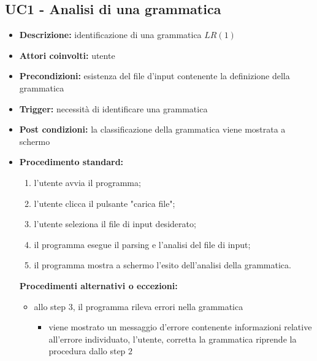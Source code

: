 \documentclass[12pt]{article}
\begin{document}
\subsection{UC1 - Analisi di una grammatica}
\begin{itemize}[label=]
\item \textbf{Descrizione:} identificazione di una grammatica $LR\left( 1 \right)$
\item \textbf{Attori coinvolti:} utente
\item \textbf{Precondizioni:} esistenza del file d'input contenente la definizione della grammatica
\item \textbf{Trigger:} necessità di identificare una grammatica
\item \textbf{Post condizioni:} la classificazione della grammatica viene mostrata a schermo
\item \textbf{Procedimento standard:}
\begin{enumerate}[label=\arabic*.]
\item l'utente avvia il programma;
\item l'utente clicca il pulsante "carica file";
\item l'utente seleziona il file di input desiderato;
\item il programma esegue il parsing e l'analisi del file di input;
\item il programma mostra a schermo l'esito dell'analisi della grammatica.
\end{enumerate}
\textbf{Procedimenti alternativi o eccezioni:}
\begin{itemize}
\item allo step $3$, il programma rileva errori nella grammatica
\begin{itemize}[label=]
\item viene mostrato un messaggio d'errore contenente informazioni relative all'errore individuato, l'utente, corretta la grammatica riprende la procedura dallo step $2$
\end{itemize}
\end{itemize}
\end{itemize}
\end{document}
